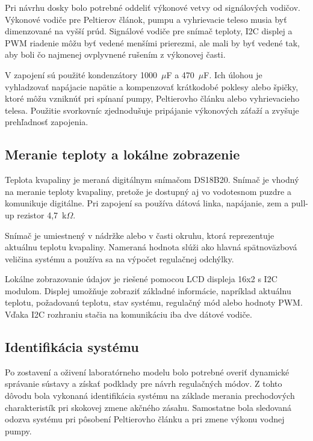 Pri návrhu dosky bolo potrebné oddeliť výkonové vetvy od signálových vodičov. Výkonové vodiče 
pre Peltierov článok, pumpu a vyhrievacie teleso musia byť dimenzované na vyšší prúd. 
Signálové vodiče pre snímač teploty, I2C displej a PWM riadenie môžu byť vedené menšími 
prierezmi, ale mali by byť vedené tak, aby boli čo najmenej ovplyvnené rušením z výkonovej časti.

V zapojení sú použité kondenzátory 1000~$\mu$F a 470~$\mu$F. Ich úlohou je vyhladzovať 
napájacie napätie a kompenzovať krátkodobé poklesy alebo špičky, ktoré môžu vzniknúť 
pri spínaní pumpy, Peltierovho článku alebo vyhrievacieho telesa. Použitie svorkovníc 
zjednodušuje pripájanie výkonových záťaží a zvyšuje prehľadnosť zapojenia.

\begin{figure}[H]
    \centering
    \label{fig:plosak_v1}
\end{figure}

\subsection{Meranie teploty a lokálne zobrazenie}

Teplota kvapaliny je meraná digitálnym snímačom DS18B20. Snímač je vhodný na meranie teploty 
kvapaliny, pretože je dostupný aj vo vodotesnom puzdre a komunikuje digitálne. Pri zapojení 
sa používa dátová linka, napájanie, zem a pull-up rezistor 4,7~k$\Omega$.

Snímač je umiestnený v nádržke alebo v časti okruhu, ktorá reprezentuje aktuálnu teplotu 
kvapaliny. Nameraná hodnota slúži ako hlavná spätnoväzbová veličina systému a používa sa 
na výpočet regulačnej odchýlky.

Lokálne zobrazovanie údajov je riešené pomocou LCD displeja 16x2 s I2C modulom. Displej 
umožňuje zobraziť základné informácie, napríklad aktuálnu teplotu, požadovanú teplotu, 
stav systému, regulačný mód alebo hodnoty PWM. Vďaka I2C rozhraniu stačia na komunikáciu 
iba dve dátové vodiče.

\subsection{Identifikácia systému}

Po zostavení a oživení laboratórneho modelu bolo potrebné overiť dynamické správanie 
sústavy a získať podklady pre návrh regulačných módov. Z tohto dôvodu bola vykonaná 
identifikácia systému na základe merania prechodových charakteristík pri skokovej zmene 
akčného zásahu. Samostatne bola sledovaná odozva systému pri pôsobení Peltierovho článku 
a pri zmene výkonu vodnej pumpy.

